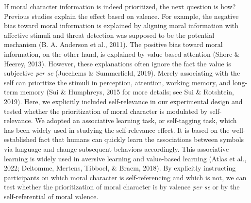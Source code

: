 \documentclass[
  man]{apa6}
\begin{document}
If moral character information is indeed prioritized, the next question is how? Previous studies explain the effect based on valence. For example, the negative bias toward moral information is explained by aligning moral information with affective stimuli and threat detection was supposed to be the potential mechanism (B. A. Anderson et al., 2011). The positive bias toward moral information, on the other hand, is explained by value-based attention (Shore \& Heerey, 2013). However, these explanations often ignore the fact the value is subjective \emph{per se} (Juechems \& Summerfield, 2019). Merely associating with the self can prioritize the stimuli in perception, attention, working memory, and long-term memory (Sui \& Humphreys, 2015 for more details; see Sui \& Rotshtein, 2019). Here, we explicitly included self-relevance in our experimental design and tested whether the prioritization of moral character is modulated by self-relevance. We adopted an associative learning task, or self-tagging task, which has been widely used in studying the self-relevance effect. It is based on the well-established fact that humans can quickly learn the associations between symbols via language and change subsequent behaviors accordingly. This associative learning is widely used in aversive learning and value-based learning (Atlas et al., 2022; Deltomme, Mertens, Tibboel, \& Braem, 2018). By explicitly instructing participants on which moral character is self-referencing and which is not, we can test whether the prioritization of moral character is by valence \emph{per se} or by the self-referential of moral valence.
\end{document}
